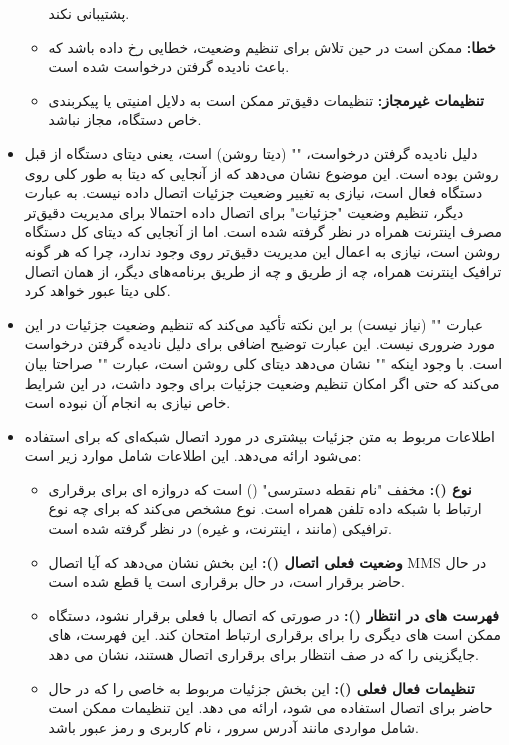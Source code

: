 \documentclass[landscape, 12pt]{report}
\begin{document}
\begin{itemize}
\begin{itemize}
	  	  پشتیبانی نکند.
	  	\item
	  	\textbf{خطا:}
	  	 ممکن است در حین تلاش برای تنظیم وضعیت، خطایی رخ داده باشد که باعث نادیده گرفتن درخواست شده است.
	  	\item
	\textbf{تنظیمات غیرمجاز:} تنظیمات دقیق‌تر ممکن است به دلایل امنیتی یا پیکربندی خاص دستگاه، مجاز نباشد.
	  \end{itemize}
	 \item 
	 دلیل نادیده گرفتن درخواست، 
	 "" 
	 (دیتا روشن) است، یعنی دیتای دستگاه از قبل روشن بوده است. این موضوع نشان می‌دهد که از آنجایی که دیتا به طور کلی روی دستگاه فعال است، نیازی به تغییر وضعیت جزئیات اتصال داده 
	  نیست.
	 به عبارت دیگر، تنظیم وضعیت "جزئیات" برای اتصال داده 
	 احتمالا برای مدیریت دقیق‌تر مصرف اینترنت همراه در نظر گرفته شده است. اما از آنجایی که دیتای کل دستگاه روشن است، نیازی به اعمال این مدیریت دقیق‌تر روی
	  وجود ندارد، چرا که هر گونه ترافیک اینترنت همراه، چه از طریق
	   و چه از طریق برنامه‌های دیگر، از همان اتصال کلی دیتا عبور خواهد کرد.
	   
	   \item 
	   عبارت 
	   ""
	    (نیاز نیست) بر این نکته تأکید می‌کند که تنظیم وضعیت جزئیات در این مورد ضروری نیست.
	   این عبارت توضیح اضافی برای دلیل نادیده گرفتن درخواست است. با وجود اینکه 
	   "" 
	   نشان می‌دهد دیتای کلی روشن است، عبارت 
	   ""
	    صراحتا بیان می‌کند که حتی اگر امکان تنظیم وضعیت جزئیات برای
	     وجود داشت، در این شرایط خاص نیازی به انجام آن نبوده است.
	   
	 \item 
	 اطلاعات مربوط به متن 
	 جزئیات بیشتری در مورد اتصال شبکه‌ای که برای
	   استفاده می‌شود ارائه می‌دهد. این اطلاعات شامل موارد زیر است:
	   \begin{itemize}
\item
\textbf{نوع
 (): }
  مخفف "نام نقطه دسترسی" 
  () 
  است که دروازه ای برای برقراری ارتباط با شبکه داده تلفن همراه است. نوع 
   مشخص می‌کند که برای چه نوع ترافیکی (مانند
    ، اینترنت، و غیره) در نظر گرفته شده است.
    \item
\textbf{وضعیت فعلی اتصال
 ():} 
این بخش نشان می‌دهد که آیا اتصال
 MMS
 در حال حاضر برقرار است، در حال برقراری است یا قطع شده است.
\item
\textbf{فهرست
  های در انتظار
  ():}
   در صورتی که اتصال با
     فعلی برقرار نشود، دستگاه ممکن است 
   های دیگری را برای برقراری ارتباط امتحان کند. این فهرست،
     های جایگزینی را که در صف انتظار برای برقراری اتصال هستند، نشان می دهد.
     \item
   \textbf{  تنظیمات
     فعال فعلی 
     (): }
     این بخش جزئیات مربوط به 
     خاصی را که در حال حاضر برای اتصال 
     استفاده می شود، ارائه می دهد. این تنظیمات ممکن است شامل مواردی مانند آدرس سرور
     ، نام کاربری و رمز عبور باشد.
	   \end{itemize}
	 

\end{itemize}
\end{document}
